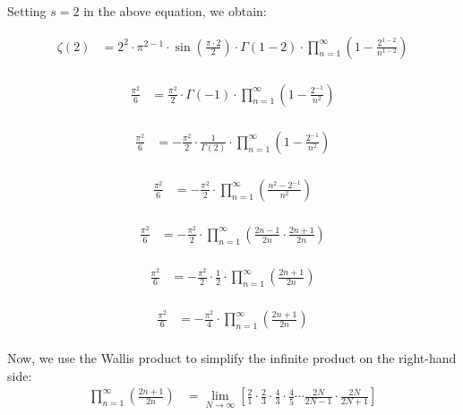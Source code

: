 \documentclass{article}
\begin{document}
Setting $s=2$ in the above equation, we obtain:

\begin{align*}
\zeta(2) &= 2^{2}\cdot\pi^{2-1}\cdot\sin(\frac{\pi\cdot2}{2})\cdot\Gamma(1-2)\cdot\prod_{n=1}^{\infty}(1-\frac{2^{1-2}}{n^{1-2}}) \\
\end{align*}

\begin{align*}
\frac{\pi^2}{6} &= \frac{\pi^2}{2}\cdot\Gamma(-1)\cdot\prod_{n=1}^{\infty}(1-\frac{2^{-1}}{n^2}) \\
\end{align*}

\begin{align*}
\frac{\pi^2}{6} &= -\frac{\pi^2}{2}\cdot\frac{1}{\Gamma(2)}\cdot\prod_{n=1}^{\infty}(1-\frac{2^{-1}}{n^2}) \\
\end{align*}

\begin{align*}
\frac{\pi^2}{6} &= -\frac{\pi^2}{2}\cdot\prod_{n=1}^{\infty}(\frac{n^2-2^{-1}}{n^2}) \\
\end{align*}

\begin{align*}
\frac{\pi^2}{6} &= -\frac{\pi^2}{2}\cdot\prod_{n=1}^{\infty}(\frac{2n-1}{2n}\cdot\frac{2n+1}{2n}) \\
\end{align*}

\begin{align*}
\frac{\pi^2}{6} &= -\frac{\pi^2}{2}\cdot\frac{1}{2}\cdot\prod_{n=1}^{\infty}(\frac{2n+1}{2n}) \\
\end{align*}

\begin{align*}
\frac{\pi^2}{6} &= -\frac{\pi^2}{4}\cdot\prod_{n=1}^{\infty}(\frac{2n+1}{2n}) \\
\end{align*}

Now, we use the Wallis product to simplify the infinite product on the right-hand side: \\

\begin{align*}
\prod_{n=1}^{\infty}(\frac{2n+1}{2n}) &= \lim_{N\to\infty}\left[\frac{2}{1}\cdot\frac{2}{3}\cdot\frac{4}{3}\cdot\frac{4}{5}\cdots\frac{2N}{2N-1}\cdot\frac{2N}{2N+1}\right] \\
\end{align*}
\end{document}
